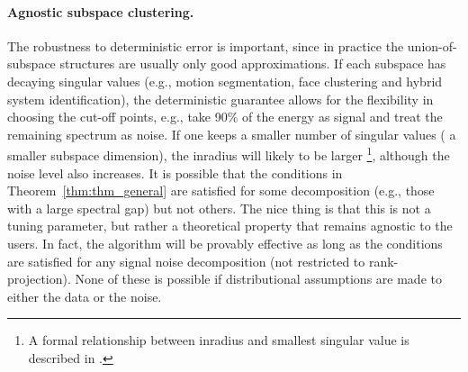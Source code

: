 \documentclass{ctexart}
\begin{document}
\paragraph{Agnostic subspace clustering.}
The robustness to deterministic error is important, since in practice the union-of-subspace structures are usually only good approximations. If each subspace has decaying singular values (e.g., motion segmentation, face clustering \cite{elhamifar2012ssc_journal} and hybrid system identification\cite{vidal2003algebraic}), the deterministic guarantee allows for the flexibility in choosing the cut-off points, e.g., take 90\% of the energy as signal and treat the remaining spectrum as noise. If one keeps a smaller number of singular values ( a smaller subspace dimension), the inradius will likely to be larger \footnote{A formal relationship between inradius and smallest singular value is described in \cite{wang2013provable}.}, although the noise level also increases. It is  possible that the conditions in Theorem~\ref{thm:thm_general} are satisfied for some decomposition (e.g., those with a large spectral gap) but not others. The nice thing is that this is not a tuning parameter, but rather a theoretical property that remains agnostic to the users. In fact, the algorithm will be provably effective as long as the conditions are satisfied for any signal noise decomposition (not restricted to rank-projection). None of these is possible if distributional assumptions are made to either the data or the noise.











\end{document}
